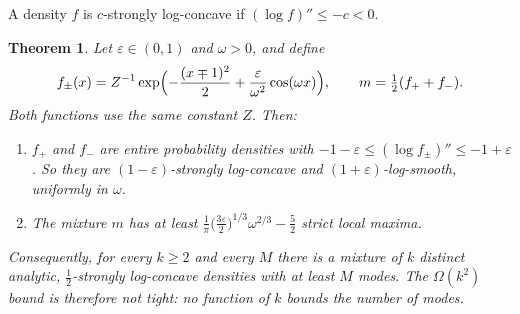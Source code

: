 \documentclass[11pt]{amsart}
\newtheorem{theorem}{Theorem}[section]
\theoremstyle{definition}
\theoremstyle{remark}
\begin{document}
A density $f$ is $c$-strongly log-concave if $(\log f)''\le-c<0$.

\begin{theorem}\label{R5:thm:modes}
Let $\varepsilon\in(0,1)$ and $\omega>0$, and define
\[
 f_\pm(x)=Z^{-1}\exp\Bigl(-\frac{(x\mp1)^2}2+\frac{\varepsilon}{\omega^2}\cos(\omega x)\Bigr),
 \qquad m=\tfrac12(f_++f_-).
\]
Both functions use the same constant $Z$.  Then:
\begin{enumerate}
\item[(i)] $f_+$ and $f_-$ are entire probability densities with
 $-1-\varepsilon\le(\log f_\pm)''\le-1+\varepsilon$.  So they are
 $(1-\varepsilon)$-strongly log-concave and $(1+\varepsilon)$-log-smooth,
 uniformly in $\omega$.
\item[(ii)] The mixture $m$ has at least
 $\frac1\pi\bigl(\frac{3\varepsilon}2\bigr)^{1/3}\omega^{2/3}-\frac52$ strict
 local maxima.
\end{enumerate}
Consequently, for every $k\ge2$ and every $M$ there is a mixture of $k$
distinct analytic, $\tfrac12$-strongly log-concave densities with at least
$M$ modes.  The $\Omega(k^2)$ bound is therefore not tight: no function of
$k$ bounds the number of modes.
\end{theorem}
\end{document}
